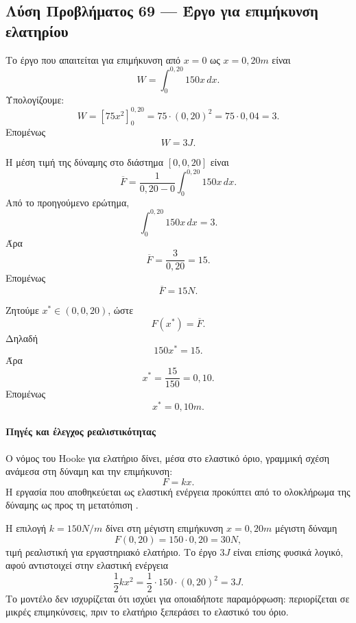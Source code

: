 \subsection*{Λύση Προβλήματος 69 --- Έργο για επιμήκυνση ελατηρίου}

\begin{alist}
  \item Το έργο που απαιτείται για επιμήκυνση από \(x=0\) ως
        \(x=0{,}20\si{m}\) είναι
        \[
          W=\int_0^{0{,}20}150x\,dx.
        \]
        Υπολογίζουμε:
        \[
          W=
          \left[75x^2\right]_0^{0{,}20}
          =
          75\cdot(0{,}20)^2
          =
          75\cdot0{,}04
          =
          3.
        \]
        Επομένως
        \[
          {W=3\si{J}}.
        \]

  \item Η μέση τιμή της δύναμης στο διάστημα \([0,0{,}20]\) είναι
        \[
          \overline{F}
          =
          \frac{1}{0{,}20-0}
          \int_0^{0{,}20}150x\,dx.
        \]
        Από το προηγούμενο ερώτημα,
        \[
          \int_0^{0{,}20}150x\,dx=3.
        \]
        Άρα
        \[
          \overline{F}
          =
          \frac{3}{0{,}20}
          =
          15.
        \]
        Επομένως
        \[
          {\overline{F}=15\si{N}}.
        \]

  \item Ζητούμε \(x^*\in(0,0{,}20)\), ώστε
        \[
          F(x^*)=\overline{F}.
        \]
        Δηλαδή
        \[
          150x^*=15.
        \]
        Άρα
        \[
          x^*=\frac{15}{150}=0{,}10.
        \]
        Επομένως
        \[
          {x^*=0{,}10\si{m}}.
        \]
\end{alist}

\paragraph{Πηγές και έλεγχος ρεαλιστικότητας}
Ο νόμος του Hooke για ελατήριο δίνει, μέσα στο ελαστικό όριο, γραμμική
σχέση ανάμεσα στη δύναμη και την επιμήκυνση:
\[
  F=kx.
\]
Η εργασία που αποθηκεύεται ως ελαστική ενέργεια προκύπτει από το
ολοκλήρωμα της δύναμης ως προς τη μετατόπιση \cite{hookesLawSpring}.

Η επιλογή \(k=150\si{N/m}\) δίνει στη μέγιστη επιμήκυνση
\(x=0{,}20\si{m}\) μέγιστη δύναμη
\[
  F(0{,}20)=150\cdot0{,}20=30\si{N},
\]
τιμή ρεαλιστική για εργαστηριακό ελατήριο. Το έργο \(3\si{J}\) είναι
επίσης φυσικά λογικό, αφού αντιστοιχεί στην ελαστική ενέργεια
\[
  \frac{1}{2}kx^2
  =
  \frac{1}{2}\cdot150\cdot(0{,}20)^2
  =
  3\si{J}.
\]
Το μοντέλο δεν ισχυρίζεται ότι ισχύει για οποιαδήποτε παραμόρφωση:
περιορίζεται σε μικρές επιμηκύνσεις, πριν το ελατήριο ξεπεράσει το
ελαστικό του όριο.
